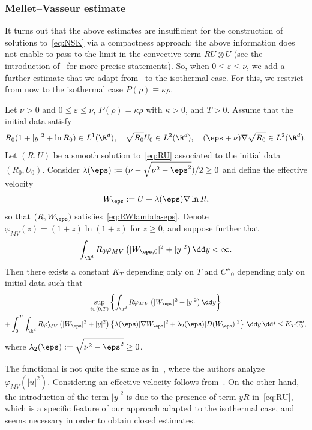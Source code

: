 \subsubsection{Mellet--Vasseur estimate}\label{sec:mellet-vasseur}

It turns out that the above estimates are insufficient for the construction of solutions to~\eqref{eq:NSK} via a compactness approach: the above information does not enable to pass to the limit in the convective term $R U \otimes U$ (see the introduction of~\cite{VasseurYuInventiones} for more precise statements). So, when $0 \le \varepsilon \le \nu$, we add a further estimate that we adapt from~\cite{MelletVasseur,AS-comp} to the isothermal case. For this, we restrict from now to the isothermal case $P(\rho)\equiv \kappa \rho.$

\begin{prop}\label{prop:inegaliteMV}
Let $\nu >0$ and $0 \le \varepsilon \le \nu$, $P(\rho) = \kappa \rho$ with $\kappa >0$, and $T>0$. Assume that the initial data satisfy
\[
R_0(1+|y|^2 + \ln R_0) \in L^1 (\R^d), \quad
\sqrt{R_0} U_0 \in L^2(\R^d), \quad (\eps+\nu) \nabla \sqrt{R_0} \in L^2(\R^d).
\]
Let $(R,U)$ be a smooth solution to~\eqref{eq:RU} associated to the initial data $(R_0,U_0)$. Consider $\lambda(\eps) := (\nu - \sqrt{\nu^2 -
\eps^2})/2 \ge 0$ and define the effective velocity
\[
W_\eps := U + \lambda(\eps) \nabla \ln R,
\]
so that $(R,W_\eps)$ satisfies~\eqref{eq:RWlambda-eps}. Denote $\varphi_{MV}(z) = (1+z)\ln(1+z)$ for $z \ge 0$, and suppose further that
\[
\int_{\R^d} R_0 \varphi_{MV}\left(|W_{\eps,0}|^2 + |y|^2\right) \dd y < \infty.
\]
Then there exists a constant $K_T$ depending only on $T$ and $C''_0$ depending only on initial data such that
\begin{multline*}
\sup_{t \in (0,T)} \left\{ \int_{\R^d} R \varphi_{MV}\left(|W_\eps|^2 + |y|^2\right) \dd y\right\} \\
+ \int_{0}^T \int_{\R^d} R \varphi'_{MV}\left(|W_\eps|^2+ |y|^2\right) \left\{ \lambda(\eps) |\nabla W_\eps|^2 + \lambda_2(\eps)|D(W_\eps)|^2 \right\} \, \dd y \, \dd t
\le K_T C''_0,
\end{multline*}
where $\lambda_2(\eps) := \sqrt{\nu^2 - \eps^2} \ge 0$.
\end{prop}

\begin{rema}
The functional is not quite the same as in~\cite{MelletVasseur}, where the authors analyze $\varphi_{MV}(|u|^2)$. Considering an effective velocity follows from~\cite{AS-comp}. On the other hand, the introduction of the term $|y|^2$ is due to the presence of term $yR$ in~\eqref{eq:RU}, which is a specific feature of our approach adapted to the isothermal case, and seems necessary in order to obtain closed estimates.
\end{rema}

